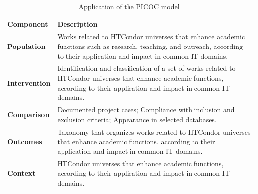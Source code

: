 \begin{table}[htbp]
	\centering
	\caption{Application of the PICOC model}
	\label{table:PICOC}
	\renewcommand{\arraystretch}{1}  %
	\begin{tabular}{p{1.4cm}p{6.4cm}}
		\toprule
		\textbf{Component}    & \textbf{Description}                                                                                                                                                               \\
		\midrule
		\textbf{Population}   & Works related to HTCondor universes that enhance academic functions such as research, teaching, and outreach, according to their application and impact in common IT domains.      \\
		\addlinespace[0.8em]
		\textbf{Intervention} & Identification and classification of a set of works related to HTCondor universes that enhance academic functions, according to their application and impact in common IT domains. \\
		\addlinespace[0.8em]
		\textbf{Comparison}   & Documented project cases; Compliance with inclusion and exclusion criteria; Appearance in selected databases.                                                                      \\
		\addlinespace[0.8em]
		\textbf{Outcomes}     & Taxonomy that organizes works related to HTCondor universes that enhance academic functions, according to their application and impact in common IT domains.                       \\
		\addlinespace[0.8em]
		\textbf{Context}      & HTCondor universes that enhance academic functions, according to their application and impact in common IT domains.                                                                \\
		\bottomrule
	\end{tabular}
\end{table}

